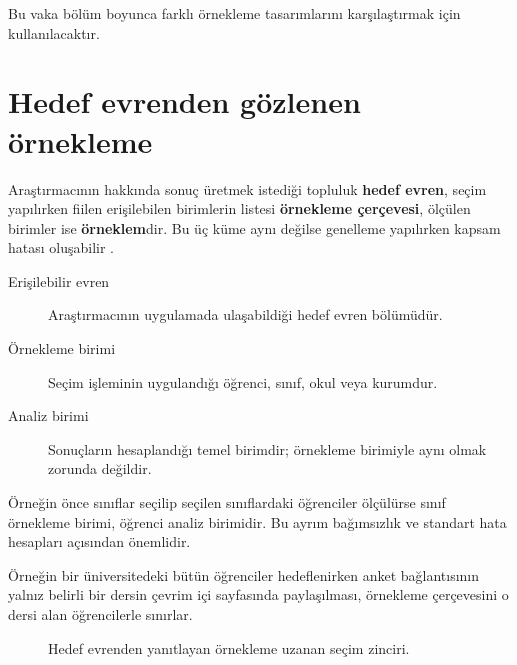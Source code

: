 Bu vaka bölüm boyunca farklı örnekleme tasarımlarını karşılaştırmak için
kullanılacaktır.

\section{Hedef evrenden gözlenen örnekleme}

Araştırmacının hakkında sonuç üretmek istediği topluluk \textbf{hedef evren},
seçim yapılırken fiilen erişilebilen birimlerin listesi \textbf{örnekleme
çerçevesi}, ölçülen birimler ise \textbf{örneklem}dir. Bu üç küme aynı değilse
genelleme yapılırken kapsam hatası oluşabilir \cite{cochran1977,lohr2021}.

\begin{description}
  \item[Erişilebilir evren] Araştırmacının uygulamada ulaşabildiği hedef evren bölümüdür.
  \item[Örnekleme birimi] Seçim işleminin uygulandığı öğrenci, sınıf, okul veya kurumdur.
  \item[Analiz birimi] Sonuçların hesaplandığı temel birimdir; örnekleme birimiyle aynı olmak zorunda değildir.
\end{description}

Örneğin önce sınıflar seçilip seçilen sınıflardaki öğrenciler ölçülürse sınıf
örnekleme birimi, öğrenci analiz birimidir. Bu ayrım bağımsızlık ve standart
hata hesapları açısından önemlidir.

Örneğin bir üniversitedeki bütün öğrenciler hedeflenirken anket bağlantısının
yalnız belirli bir dersin çevrim içi sayfasında paylaşılması, örnekleme
çerçevesini o dersi alan öğrencilerle sınırlar.

\begin{figure}[htbp]
\centering
{}
\caption{Hedef evrenden yanıtlayan örnekleme uzanan seçim zinciri.}
\end{figure}

